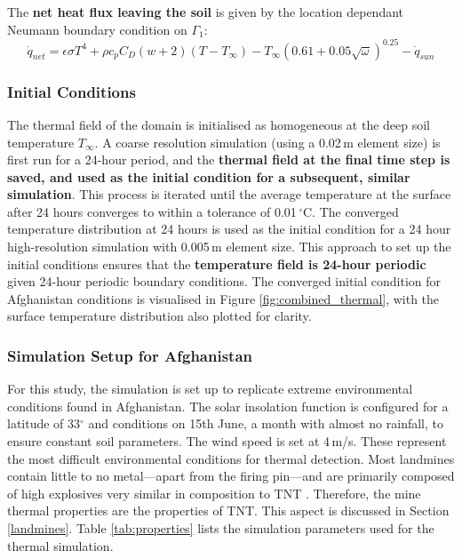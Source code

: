         \noindent The \textbf{net heat flux leaving the soil} is given by the location dependant Neumann boundary condition on $\Gamma_1$:
        \begin{equation}
        \dot{q}_{net} = \epsilon \sigma T^4+ \rho c_p C_D(w+2)(T - T_{\infty}) - T_{\infty} \left( 0.61 + 0.05 \sqrt{\omega} \right)^{0.25}  - \dot{q}_{sun}
        \end{equation}
        
    \subsubsection{Initial Conditions} \label{sec:cv_initial_conditions}

        \noindent The thermal field of the domain is initialised as homogeneous at the deep soil temperature $T_{\infty}$. A coarse resolution simulation (using a 0.02\,m element size) is first run for a 24-hour period, and the \textbf{thermal field at the final time step is saved, and used as the initial condition for a subsequent, similar simulation}. This process is iterated until the average temperature at the surface after 24 hours converges to within a tolerance of 0.01\,$^{\circ}$C. The converged temperature distribution at 24 hours is used as the initial condition for a 24 hour high-resolution simulation with 0.005\,m element size. This approach to set up the initial conditions ensures that the \textbf{temperature field is 24-hour periodic} given 24-hour periodic boundary conditions. The converged initial condition for Afghanistan conditions is visualised in Figure \ref{fig:combined_thermal}, with the surface temperature distribution also plotted for clarity.

    \subsubsection{Simulation Setup for Afghanistan} \label{thermal_setup}
    
        For this study, the simulation is set up to replicate extreme environmental conditions found in Afghanistan. The solar insolation function is configured for a latitude of 33\(^\circ\) and conditions on 15th June, a month with almost no rainfall, to ensure constant soil parameters. The wind speed is set at 4\,m/s. These represent the most difficult environmental conditions for thermal detection. Most landmines contain little to no metal—apart from the firing pin—and are primarily composed of high explosives very similar in composition to TNT \cite{szymanik2011soil}. Therefore, the mine thermal properties are the properties of TNT. This aspect is discussed in Section \ref{landmines}. Table \ref{tab:properties} lists the simulation parameters used for the thermal simulation.
    
